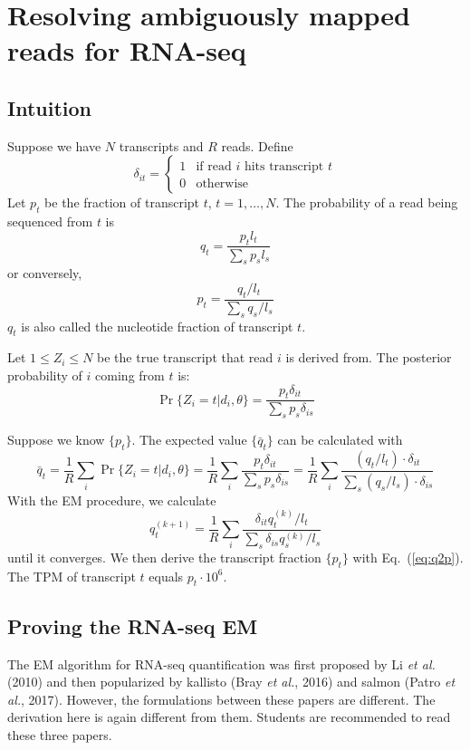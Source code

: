 \documentclass[10pt]{article}
\begin{document}
\newpage

\section{Resolving ambiguously mapped reads for RNA-seq}

\subsection{Intuition}
Suppose we have $N$ transcripts and $R$ reads.
Define
$$
\delta_{it}=\left\{\begin{array}{ll}
1 & \mbox{if read $i$ hits transcript $t$} \\
0 & \mbox{otherwise}
\end{array}\right.
$$
Let $p_t$ be the fraction of transcript $t$, $t=1,\ldots,N$.
The probability of a read being sequenced from $t$ is
\begin{equation}\label{eq:p2q}
q_t=\frac{p_tl_t}{\sum_s{p_sl_s}}
\end{equation}
or conversely,
\begin{equation}\label{eq:q2p}
p_t=\frac{q_t/l_t}{\sum_s q_s/l_s}
\end{equation}
$q_t$ is also called the nucleotide fraction of transcript $t$.

Let $1\le Z_i\le N$ be the true transcript that read $i$ is derived from. The
posterior probability of $i$ coming from $t$ is:
$$
\Pr\{Z_i=t|d_i,\theta\}=\frac{p_t\delta_{it}}{\sum_{s}p_s\delta_{is}}
$$

Suppose we know $\{p_t\}$. The expected value $\{\bar{q}_t\}$ can be calculated with
$$
\bar{q}_t=\frac{1}{R}\sum_i{\Pr\{Z_i=t|d_i,\theta\}}=\frac{1}{R}\sum_i\frac{p_t\delta_{it}}{\sum_s{p_s\delta_{is}}}
=\frac{1}{R}\sum_i\frac{(q_t/l_t)\cdot\delta_{it}}{\sum_s{(q_s/l_s)\cdot\delta_{is}}}
$$
With the EM procedure, we calculate
\begin{equation}\label{eq:rna-em}
q_t^{(k+1)}=\frac{1}{R}\sum_i\frac{\delta_{it}q_t^{(k)}/l_t}{\sum_s{\delta_{is}q_s^{(k)}/l_s}}
\end{equation}
until it converges.
We then derive the transcript fraction $\{p_t\}$ with Eq.~(\ref{eq:q2p}).
The TPM of transcript $t$ equals $p_t\cdot10^6$.

\subsection{Proving the RNA-seq EM}

The EM algorithm for RNA-seq quantification was first proposed by Li \emph{et
al.} (2010) and then popularized by kallisto (Bray \emph{et al.}, 2016) and
salmon (Patro \emph{et al.}, 2017).
However, the formulations between these papers are different.
The derivation here is again different from them.
Students are recommended to read these three papers.
\end{document}
